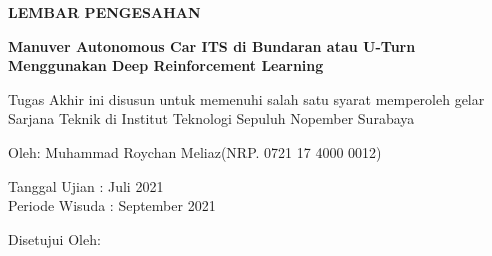 \begin{center}
	\large
  \textbf{LEMBAR PENGESAHAN}
\end{center}

\thispagestyle{empty}

\begin{center}
  \textbf{Manuver Autonomous Car ITS di Bundaran atau U-Turn Menggunakan Deep Reinforcement Learning}
\end{center}

\begingroup
  \small

  \begin{center}
    Tugas Akhir ini disusun untuk memenuhi salah satu syarat memperoleh gelar Sarjana Teknik di Institut Teknologi Sepuluh Nopember Surabaya
  \end{center}

  \begin{center}
    Oleh: Muhammad Roychan Meliaz(NRP. 0721 17 4000 0012)
  \end{center}

  \begin{center}
    Tanggal Ujian : Juli 2021\\
    Periode Wisuda : September 2021
  \end{center}

  \begin{center}
    Disetujui Oleh:
  \end{center}

  \begingroup
    \setlength{\tabcolsep}{0pt}

